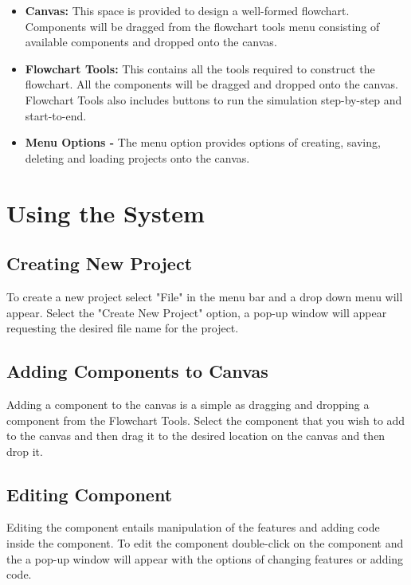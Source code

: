 \documentclass[11pt,a4paper,titlepage]{article}
\begin{document}
		\begin{itemize}
			\item \textbf{Canvas:} This space is provided to design a 			well-formed flowchart. Components will be dragged from the flowchart 				tools menu consisting of available components and dropped onto the 				canvas.
			
			\item \textbf{Flowchart Tools:} This contains all the tools 				required to construct the flowchart. All the components will be 			dragged and dropped onto the canvas. Flowchart Tools also includes 				buttons to run the simulation step-by-step and start-to-end.
			
			\item \textbf{Menu Options -} The menu option provides options of 				creating, saving, deleting and loading projects onto the canvas.
			
		\end{itemize}
	
	\newpage
\section{Using the System}
	\subsection{Creating New Project}
	
		To create a new project select "File" in the menu bar and a drop down menu will appear. Select the "Create New Project" option, a pop-up window will appear requesting the desired file name for the project.
		
		
	\subsection{Adding Components to Canvas}
	
	Adding a component to the canvas is a simple as dragging and dropping a component from the Flowchart Tools. Select the component that you wish to add to the canvas and then drag it to the desired location on the canvas and then drop it.
	
	\subsection{Editing Component}
	
	Editing the component entails manipulation of the features and adding code inside the component. To edit the component double-click on the component and the a pop-up window will appear with the options of changing features or adding code.
		
\end{document}
